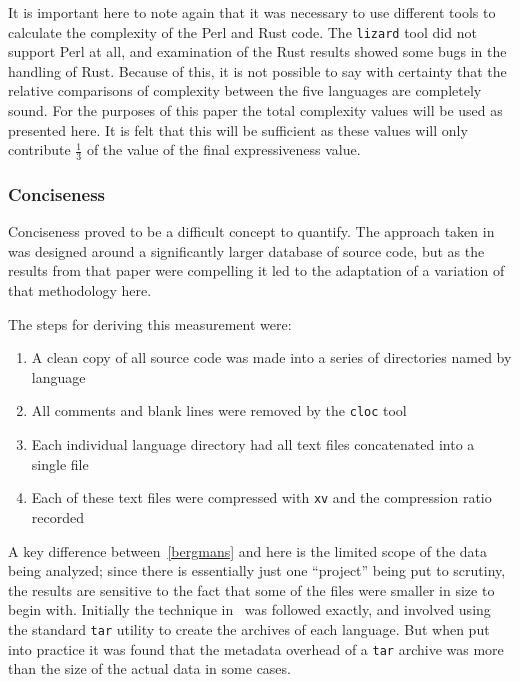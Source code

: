 It is important here to note again that it was necessary to use different tools to calculate the complexity of the Perl and Rust code. The \texttt{lizard} tool did not support Perl at all, and examination of the Rust results showed some bugs in the handling of Rust. Because of this, it is not possible to say with certainty that the relative comparisons of complexity between the five languages are completely sound. For the purposes of this paper the total complexity values will be used as presented here. It is felt that this will be sufficient as these values will only contribute $\frac{1}{3}$ of the value of the final expressiveness value.

\subsubsection{Conciseness}
\label{subsubsec:conciseness}

Conciseness proved to be a difficult concept to quantify. The approach taken in~\cite{bergmans} was designed around a significantly larger database of source code, but as the results from that paper were compelling it led to the adaptation of a variation of that methodology here.

The steps for deriving this measurement were:

\begin{enumerate}
\item A clean copy of all source code was made into a series of directories named by language
\item All comments and blank lines were removed by the \texttt{cloc} tool
\item Each individual language directory had all text files concatenated into a single file
\item Each of these text files were compressed with \texttt{xv} and the compression ratio recorded
\end{enumerate}

A key difference between~\ref{bergmans} and here is the limited scope of the data being analyzed; since there is essentially just one ``project'' being put to scrutiny, the results are sensitive to the fact that some of the files were smaller in size to begin with. Initially the technique in~\cite{bergmans} was followed exactly, and involved using the standard \texttt{tar} utility to create the archives of each language. But when put into practice it was found that the metadata overhead of a \texttt{tar} archive was more than the size of the actual data in some cases.

